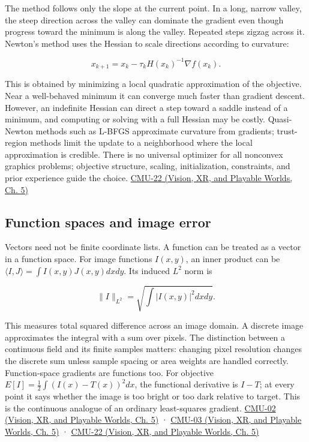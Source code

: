 The method follows only the slope at the current point. In a long, narrow valley, the steep direction across the valley can dominate the gradient even though progress toward the minimum is along the valley. Repeated steps zigzag across it. Newton's method uses the Hessian to scale directions according to curvature:

\[
x_{k+1}=x_k-\tau_k H(x_k)^{-1}\nabla f(x_k).
\]

This is obtained by minimizing a local quadratic approximation of the objective. Near a well-behaved minimum it can converge much faster than gradient descent. However, an indefinite Hessian can direct a step toward a saddle instead of a minimum, and computing or solving with a full Hessian may be costly. Quasi-Newton methods such as L-BFGS approximate curvature from gradients; trust-region methods limit the update to a neighborhood where the local approximation is credible. There is no universal optimizer for all nonconvex graphics problems; objective structure, scaling, initialization, constraints, and prior experience guide the choice. \href{../07-Vision-XR-and-Playable-Worlds/main.pdf\#nameddest=04-visual-computing-ii-ch036-cmu-22---optimization}{CMU-22 (Vision, XR, and Playable Worlds, Ch. 5)}

\subsection{Function spaces and image error}\label{04-visual-computing-ii-ch029-function-spaces-and-image-error}

Vectors need not be finite coordinate lists. A function can be treated as a vector in a function space. For image functions \(I(x,y)\), an inner product can be \(\langle I,J\rangle=\int I(x,y)J(x,y)dxdy\). Its induced \(L^2\) norm is

\[
\|I\|_{L^2}=\sqrt{\int |I(x,y)|^2dxdy}.
\]

This measures total squared difference across an image domain. A discrete image approximates the integral with a sum over pixels. The distinction between a continuous field and its finite samples matters: changing pixel resolution changes the discrete sum unless sample spacing or area weights are handled correctly. Function-space gradients are functions too. For objective \(E[I]=\tfrac12\int (I(x)-T(x))^2dx\), the functional derivative is \(I-T\); at every point it says whether the image is too bright or too dark relative to target. This is the continuous analogue of an ordinary least-squares gradient. \href{../07-Vision-XR-and-Playable-Worlds/main.pdf\#nameddest=04-visual-computing-ii-ch036-cmu-02---linear-algebra-preview}{CMU-02 (Vision, XR, and Playable Worlds, Ch. 5)} · \href{../07-Vision-XR-and-Playable-Worlds/main.pdf\#nameddest=04-visual-computing-ii-ch036-cmu-03---vector-calculus-preview}{CMU-03 (Vision, XR, and Playable Worlds, Ch. 5)} · \href{../07-Vision-XR-and-Playable-Worlds/main.pdf\#nameddest=04-visual-computing-ii-ch036-cmu-22---optimization}{CMU-22 (Vision, XR, and Playable Worlds, Ch. 5)}

